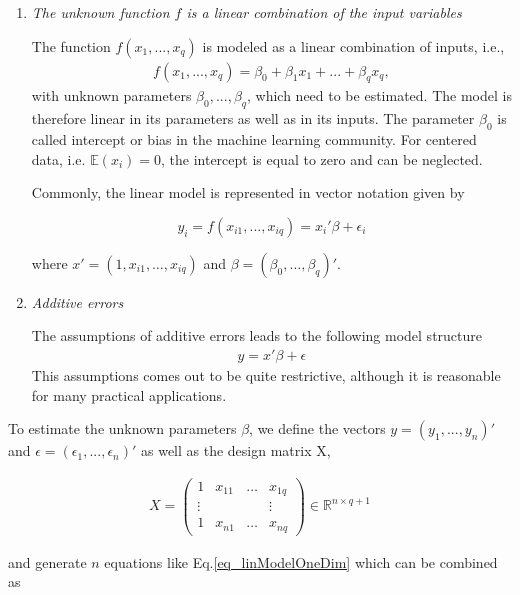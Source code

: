 \begin{enumerate}
	\item \emph{The unknown function $f$ is a linear combination of the input variables}
	
	The function $f(x_1, ..., x_q)$ is modeled as a linear combination of inputs, i.e.,
	\begin{align} \label{linCombOfInputs}
		f(x_1, ..., x_q) = \beta_0 + \beta_1 x_1 + ... + \beta_q x_q,
	\end{align}
	with unknown parameters $\beta_0, ..., \beta_q$, which need to be estimated. The model is therefore linear in its parameters as well as in its inputs. \cite{bishop2006patternRecognition} The parameter $\beta_0$ is called intercept or bias in the machine learning community. For centered data, i.e. $\mathbb{E}(x_i) = 0$, the intercept is equal to zero and can be neglected.
	
	Commonly, the linear model is represented in vector notation given by
	
	$$ y_i = f(x_{i1}, ..., x_{iq})  = x_i' \beta + \epsilon_i $$
	
	where $x' = (1, x_{i1}, \dots, x_{iq})$ and $\beta = (\beta_0, \dots, \beta_q)'$.
	
	\item \emph{Additive errors}
	
	The assumptions of additive errors leads to the following model structure
	\begin{align} \label{eq_linModelOneDim}
		y = x'\beta + \epsilon
	\end{align}
	This assumptions comes out to be quite restrictive, although it is reasonable for many practical applications.
\end{enumerate}

To estimate the unknown parameters $\beta$, we define the vectors $y = (y_1, ..., y_n)'$ and $\epsilon = (\epsilon_1, ..., \epsilon_n)'$ as well as the design matrix X, 

\begin{align}
	X = \begin{pmatrix}   1     & x_{11} & \dots & x_{1q} \\ 
					 	 \vdots &        &       & \vdots \\ 
				  		  1     & x_{n1} & \dots & x_{nq}  
		\end{pmatrix} \in \mathbb{R}^{n \times q+1}		
\end{align}

and generate $n$ equations like Eq.\ref{eq_linModelOneDim} which can be combined as 

